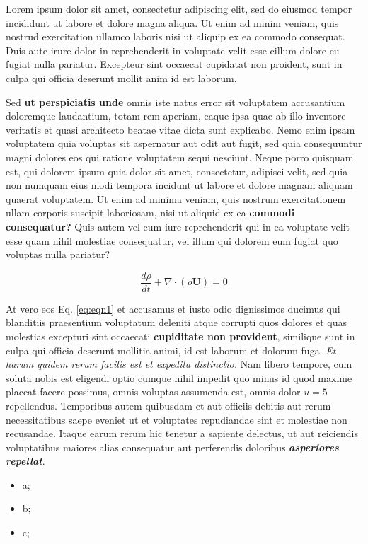 Lorem ipsum dolor sit amet, consectetur adipiscing elit, sed do eiusmod tempor incididunt ut labore et dolore magna aliqua. Ut enim ad minim veniam, quis nostrud exercitation ullamco laboris nisi ut aliquip ex ea commodo consequat. Duis aute irure dolor in reprehenderit in voluptate velit esse cillum dolore eu fugiat nulla pariatur. Excepteur sint occaecat cupidatat non proident, sunt in culpa qui officia deserunt mollit anim id est laborum.

Sed \textbf{ut perspiciatis unde} omnis iste natus error sit voluptatem accusantium doloremque laudantium, totam rem aperiam, eaque ipsa quae ab illo inventore veritatis et quasi architecto beatae vitae dicta sunt explicabo. Nemo enim ipsam voluptatem quia voluptas sit aspernatur aut odit aut fugit, sed quia consequuntur magni dolores eos qui ratione voluptatem sequi nesciunt. Neque porro quisquam est, qui dolorem ipsum quia dolor sit amet, consectetur, adipisci velit, sed quia non numquam eius modi tempora incidunt ut labore et dolore magnam aliquam quaerat voluptatem. Ut enim ad minima veniam, quis nostrum exercitationem ullam corporis suscipit laboriosam, nisi ut aliquid ex ea \textbf{commodi consequatur?} Quis autem vel eum iure reprehenderit qui in ea voluptate velit esse quam nihil molestiae consequatur, vel illum qui dolorem eum fugiat quo voluptas nulla pariatur?

\begin{equation}
\frac{d\rho}{dt} 
+ \nabla \cdot \left( \rho \mathbf{U} \right) = 0 
\label{eq:eqn1}
\end{equation}

At vero eos Eq. \eqref{eq:eqn1} et accusamus et iusto odio dignissimos ducimus qui blanditiis praesentium voluptatum deleniti atque corrupti quos dolores et quas molestias excepturi sint occaecati \textbf{cupiditate non provident}, similique sunt in culpa qui officia deserunt mollitia animi, id est laborum et dolorum fuga. \textit{Et harum quidem rerum facilis est et expedita distinctio.} Nam libero tempore, cum soluta nobis est eligendi optio cumque nihil impedit quo minus id quod maxime placeat facere possimus, omnis voluptas assumenda est, omnis dolor $u = 5$ repellendus. Temporibus autem quibusdam et aut officiis debitis aut rerum necessitatibus saepe eveniet ut et voluptates repudiandae sint et molestiae non recusandae. Itaque earum rerum hic tenetur a sapiente delectus, ut aut reiciendis voluptatibus maiores alias consequatur aut perferendis doloribus \textit{\textbf{asperiores repellat}}.

\begin{itemize}
\item a;
\item b;
\item c;
\end{itemize}
